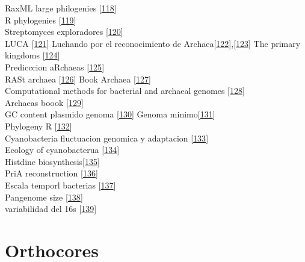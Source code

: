 \documentclass[12pt,twoside]{reedthesis}
\begin{document}
  RaxML large philogenies
  {[}\protect\hyperlink{ref-stamatakis_raxml_2014}{118}{]}\\
  R phylogenies
  {[}\protect\hyperlink{ref-phyloseq_powerful_2016}{119}{]}\\
  Streptomyces exploradores
  {[}\protect\hyperlink{ref-zacharia_exploring_2017}{120}{]}\\
  LUCA {[}\protect\hyperlink{ref-woese_universal_1998}{121}{]} Luchando
  por el reconocimiento de
  Archaea{[}\protect\hyperlink{ref-woese_are_1981}{122}{]},{[}\protect\hyperlink{ref-woese_towards_1990}{123}{]}
  The primary kingdoms
  {[}\protect\hyperlink{ref-woese_phylogenetic_1977}{124}{]}\\
  Predicccion aRchaeas
  {[}\protect\hyperlink{ref-woese_there_1994}{125}{]}\\
  RASt archaea {[}\protect\hyperlink{ref-graham_archaeal_2000}{126}{]}
  Book Archaea
  {[}\protect\hyperlink{ref-howland_surprising_2000}{127}{]}\\
  Computational methods for bacterial and archaeal genomes
  {[}\protect\hyperlink{ref-xu_computational_2008}{128}{]}\\
  Archaeas boook {[}\protect\hyperlink{ref-garrett_archaea_2008}{129}{]}\\
  GC content plasmido genoma
  {[}\protect\hyperlink{ref-nishida_evolution_2012}{130}{]} Genoma
  minimo{[}\protect\hyperlink{ref-coyle_mysteries_2016}{131}{]}\\
  Phylogeny R {[}\protect\hyperlink{ref-omeara_cran_2016}{132}{]}\\
  Cyanobacteria fluctuacion genomica y adaptacion
  {[}\protect\hyperlink{ref-larsson_genome_2011}{133}{]}\\
  Ecology of cyanobacterua
  {[}\protect\hyperlink{ref-whitton_ecology_2012}{134}{]}\\
  Histdine
  biosynthesis{[}\protect\hyperlink{ref-cohen_biosynthesis_2004}{135}{]}\\
  PriA reconstruction
  {[}\protect\hyperlink{ref-plach_long-term_2016}{136}{]}\\
  Escala temporl bacterias
  {[}\protect\hyperlink{ref-battistuzzi_genomic_2004}{137}{]}\\
  Pangenome size
  {[}\protect\hyperlink{ref-lapierre_estimating_2009}{138}{]}\\
  variabilidad del 16s
  {[}\protect\hyperlink{ref-vetrovsky_variability_2013}{139}{]}
  
  \chapter{Orthocores}\label{orthocores}
  
\end{document}
